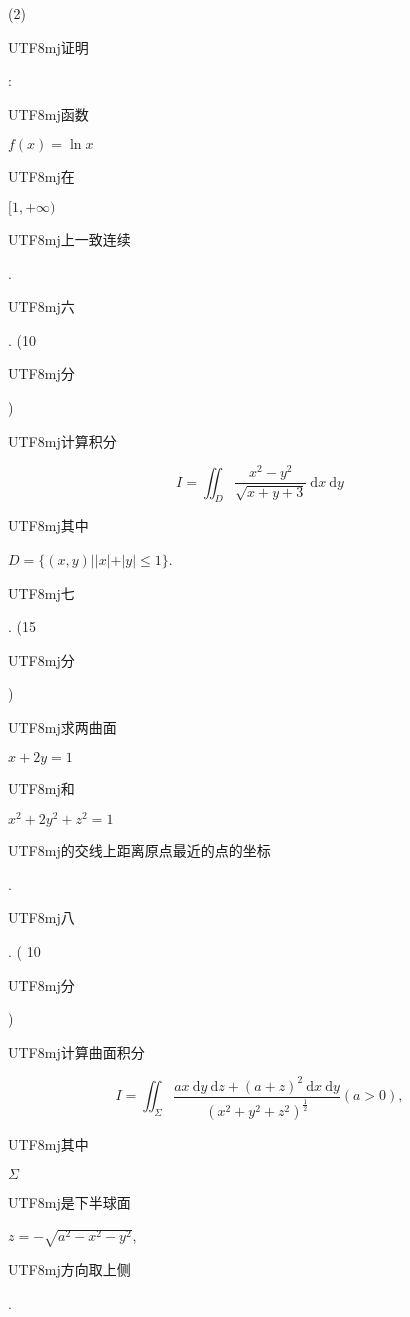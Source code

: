 \documentclass[10pt]{article}
\begin{document}
(2) \begin{CJK}{UTF8}{mj}证明\end{CJK}: \begin{CJK}{UTF8}{mj}函数\end{CJK} $f(x)=\ln x$ \begin{CJK}{UTF8}{mj}在\end{CJK} $[1,+\infty)$ \begin{CJK}{UTF8}{mj}上一致连续\end{CJK}.

\begin{CJK}{UTF8}{mj}六\end{CJK}. (10 \begin{CJK}{UTF8}{mj}分\end{CJK}) \begin{CJK}{UTF8}{mj}计算积分\end{CJK}
$$
I=\iint_{D} \frac{x^{2}-y^{2}}{\sqrt{x+y+3}} \mathrm{~d} x \mathrm{~d} y
$$
\begin{CJK}{UTF8}{mj}其中\end{CJK} $D=\{(x, y)|| x|+| y \mid \leqslant 1\}$.

\begin{CJK}{UTF8}{mj}七\end{CJK}. (15 \begin{CJK}{UTF8}{mj}分\end{CJK}) \begin{CJK}{UTF8}{mj}求两曲面\end{CJK} $x+2 y=1$ \begin{CJK}{UTF8}{mj}和\end{CJK} $x^{2}+2 y^{2}+z^{2}=1$ \begin{CJK}{UTF8}{mj}的交线上距离原点最近的点的坐标\end{CJK}. \begin{CJK}{UTF8}{mj}八\end{CJK}. ( 10 \begin{CJK}{UTF8}{mj}分\end{CJK}) \begin{CJK}{UTF8}{mj}计算曲面积分\end{CJK}
$$
I=\iint_{\Sigma} \frac{a x \mathrm{~d} y \mathrm{~d} z+(a+z)^{2} \mathrm{~d} x \mathrm{~d} y}{\left(x^{2}+y^{2}+z^{2}\right)^{\frac{1}{2}}}(a>0),
$$
\begin{CJK}{UTF8}{mj}其中\end{CJK} $\Sigma$ \begin{CJK}{UTF8}{mj}是下半球面\end{CJK} $z=-\sqrt{a^{2}-x^{2}-y^{2}}$, \begin{CJK}{UTF8}{mj}方向取上侧\end{CJK}.
\end{document}
